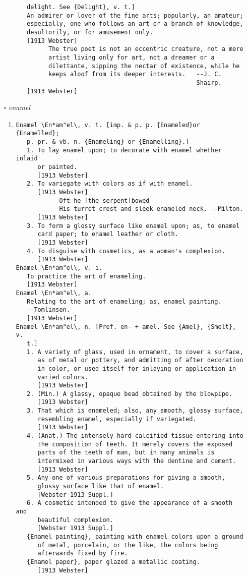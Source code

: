\documentclass{article}
\begin{document}
\begin{itemize}
\begin{enumerate}
{\begin{lstlisting}
   delight. See {Delight}, v. t.]
   An admirer or lover of the fine arts; popularly, an amateur;
   especially, one who follows an art or a branch of knowledge,
   desultorily, or for amusement only.
   [1913 Webster]
         The true poet is not an eccentric creature, not a mere
         artist living only for art, not a dreamer or a
         dilettante, sipping the nectar of existence, while he
         keeps aloof from its deeper interests.   --J. C.
                                                  Shairp.
   [1913 Webster]
\end{lstlisting}}
\end{enumerate}
\item[$\square$] \emph{ enamel }
\begin{enumerate}
\item{
\begin{lstlisting}
Enamel \En*am"el\, v. t. [imp. & p. p. {Enameled}or {Enamelled};
   p. pr. & vb. n. {Enameling} or {Enamelling}.]
   1. To lay enamel upon; to decorate with enamel whether inlaid
      or painted.
      [1913 Webster]
   2. To variegate with colors as if with enamel.
      [1913 Webster]
            Oft he [the serpent]bowed
            His turret crest and sleek enameled neck. --Milton.
      [1913 Webster]
   3. To form a glossy surface like enamel upon; as, to enamel
      card paper; to enamel leather or cloth.
      [1913 Webster]
   4. To disguise with cosmetics, as a woman's complexion.
      [1913 Webster]
Enamel \En*am"el\, v. i.
   To practice the art of enameling.
   [1913 Webster]
Enamel \En*am"el\, a.
   Relating to the art of enameling; as, enamel painting.
   --Tomlinson.
   [1913 Webster]
Enamel \En*am"el\, n. [Pref. en- + amel. See {Amel}, {Smelt}, v.
   t.]
   1. A variety of glass, used in ornament, to cover a surface,
      as of metal or pottery, and admitting of after decoration
      in color, or used itself for inlaying or application in
      varied colors.
      [1913 Webster]
   2. (Min.) A glassy, opaque bead obtained by the blowpipe.
      [1913 Webster]
   3. That which is enameled; also, any smooth, glossy surface,
      resembling enamel, especially if variegated.
      [1913 Webster]
   4. (Anat.) The intensely hard calcified tissue entering into
      the composition of teeth. It merely covers the exposed
      parts of the teeth of man, but in many animals is
      intermixed in various ways with the dentine and cement.
      [1913 Webster]
   5. Any one of various preparations for giving a smooth,
      glossy surface like that of enamel.
      [Webster 1913 Suppl.]
   6. A cosmetic intended to give the appearance of a smooth and
      beautiful complexion.
      [Webster 1913 Suppl.]
   {Enamel painting}, painting with enamel colors upon a ground
      of metal, porcelain, or the like, the colors being
      afterwards fixed by fire.
   {Enamel paper}, paper glazed a metallic coating.
      [1913 Webster]
\end{lstlisting}}
\end{enumerate}
\end{itemize}
\end{document}
